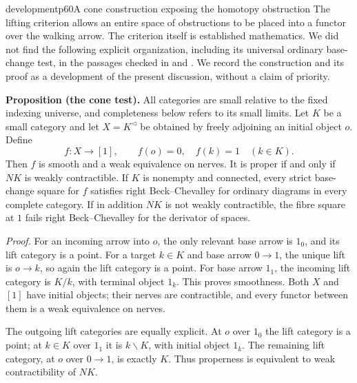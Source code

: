 \begin{dcomment}{development}{p60}{A cone construction exposing the homotopy obstruction}
The lifting criterion allows an entire space of obstructions to be placed into a functor over the walking arrow. The criterion itself is established mathematics. We did not find the following explicit organization, including its universal ordinary base-change test, in the passages checked in \citet[\S1 and \S4]{Maltsiniotis2005Asphericite} and \citet[\S3]{GrothPontoShulman2014}. We record the construction and its proof as a development of the present discussion, without a claim of priority.

\textbf{Proposition (the cone test).}\ours
All categories are small relative to the fixed indexing universe, and completeness below refers to its small limits. Let $K$ be a small category and let $X=K^{\triangleleft}$ be obtained by freely adjoining an initial object $o$. Define
\[
 f:X\longrightarrow[1],\qquad f(o)=0,\quad f(k)=1\quad(k\in K).
\]
Then $f$ is smooth and a weak equivalence on nerves. It is proper if and only if $NK$ is weakly contractible. If $K$ is nonempty and connected, every strict base-change square for $f$ satisfies right Beck--Chevalley for ordinary diagrams in every complete category. If in addition $NK$ is not weakly contractible, the fibre square at $1$ fails right Beck--Chevalley for the derivator of spaces.

\emph{Proof.} For an incoming arrow into $o$, the only relevant base arrow is $1_0$, and its lift category is a point. For a target $k\in K$ and base arrow $0\to1$, the unique lift is $o\to k$, so again the lift category is a point. For base arrow $1_1$, the incoming lift category is $K/k$, with terminal object $1_k$. This proves smoothness. Both $X$ and $[1]$ have initial objects; their nerves are contractible, and every functor between them is a weak equivalence on nerves.

The outgoing lift categories are equally explicit. At $o$ over $1_0$ the lift category is a point; at $k\in K$ over $1_1$ it is $k\backslash K$, with initial object $1_k$. The remaining lift category, at $o$ over $0\to1$, is exactly $K$. Thus properness is equivalent to weak contractibility of $NK$.


\end{dcomment}
